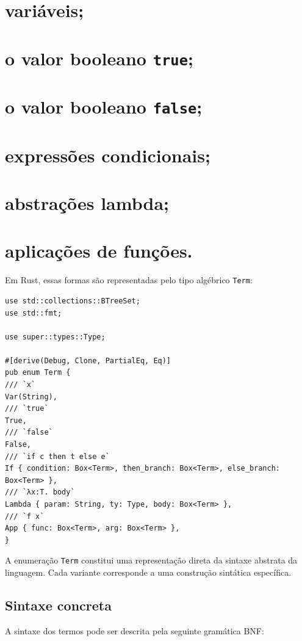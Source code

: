 \documentclass[11pt]{article}
\begin{document}
\section{variáveis;}
\label{sec:orgd5eff92}
\section{o valor booleano \texttt{true};}
\label{sec:org8abbb0c}
\section{o valor booleano \texttt{false};}
\label{sec:orgb34ae02}
\section{expressões condicionais;}
\label{sec:org0f1daee}
\section{abstrações lambda;}
\label{sec:orgdd7b30b}
\section{aplicações de funções.}
\label{sec:orgc6ebb9b}

Em Rust, essas formas são representadas pelo tipo algébrico \texttt{Term}:

\begin{verbatim}
use std::collections::BTreeSet;
use std::fmt;

use super::types::Type;

#[derive(Debug, Clone, PartialEq, Eq)]
pub enum Term {
/// `x`
Var(String),
/// `true`
True,
/// `false`
False,
/// `if c then t else e`
If { condition: Box<Term>, then_branch: Box<Term>, else_branch: Box<Term> },
/// `λx:T. body`
Lambda { param: String, ty: Type, body: Box<Term> },
/// `f x`
App { func: Box<Term>, arg: Box<Term> },
}
\end{verbatim}

A enumeração \texttt{Term} constitui uma representação direta da sintaxe abstrata
da linguagem. Cada variante corresponde a uma construção sintática
específica.
\subsection{Sintaxe concreta}
\label{sec:orgcc7fcbd}

A sintaxe dos termos pode ser descrita pela seguinte gramática BNF:
\end{document}
